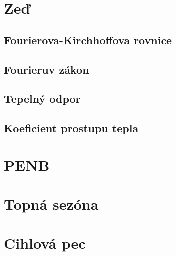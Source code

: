 \documentclass{article}
\begin{document}



\maketitle
\tableofcontents
\newpage



\section{Zeď \spicy \spicy}


\subsection{Fourierova-Kirchhoffova rovnice \spicy \spicy \spicy}


\subsection{Fourieruv zákon \spicy \spicy \spicy}


\subsection{Tepelný odpor}


\subsection{Koeficient prostupu tepla}



\section{PENB \spicy \spicy \spicy}



\section{Topná sezóna \spicy \spicy \spicy}



\section{Cihlová pec \spicy \spicy \spicy \spicy}
\end{document}
